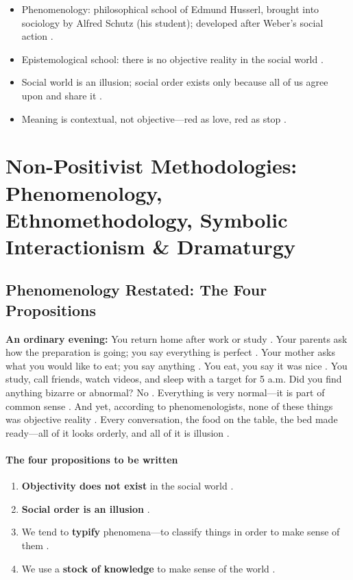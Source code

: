 \begin{QuickRevision}
\begin{itemize}
    \item Phenomenology: philosophical school of Edmund Husserl, brought into sociology by Alfred Schutz (his student); developed after Weber's social action .
    \item Epistemological school: there is no objective reality in the social world .
    \item Social world is an illusion; social order exists only because all of us agree upon and share it .
    \item Meaning is contextual, not objective---red as love, red as stop .
\end{itemize}
\end{QuickRevision}

\sectiondivider

\section{Non-Positivist Methodologies: Phenomenology, Ethnomethodology, Symbolic Interactionism \& Dramaturgy}

\subsection{Phenomenology Restated: The Four Propositions}

\begin{ExampleBox}
\textbf{An ordinary evening:} You return home after work or study . Your parents ask how the preparation is going; you say everything is perfect . Your mother asks what you would like to eat; you say anything . You eat, you say it was nice . You study, call friends, watch videos, and sleep with a target for 5 a.m.  Did you find anything bizarre or abnormal? No . Everything is very normal---it is part of common sense . And yet, according to phenomenologists, none of these things was objective reality . Every conversation, the food on the table, the bed made ready---all of it looks orderly, and all of it is illusion .
\end{ExampleBox}

\paragraph{The four propositions to be written}
\begin{enumerate}
    \item \textbf{Objectivity does not exist} in the social world .
    \item \textbf{Social order is an illusion} .
    \item We tend to \textbf{typify} phenomena---to classify things in order to make sense of them .
    \item We use a \textbf{stock of knowledge} to make sense of the world .
\end{enumerate}

